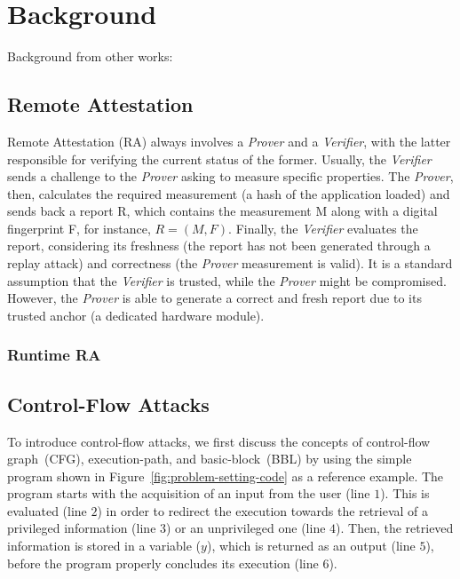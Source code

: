 \chapter{Background}
\label{chp:background} 

Background from other works:

\section{Remote Attestation}
\label{sec:remote-attestation}

Remote Attestation (RA) always involves a \emph{Prover} and a \emph{Verifier}, 
with the latter responsible for verifying the current status of the former. 
Usually, the \emph{Verifier} sends a challenge to the \emph{Prover} asking to 
measure specific properties. The \emph{Prover}, then, calculates the required 
measurement (\eg a hash of the application loaded) and sends back a report R, 
which contains the measurement M along with a digital fingerprint F, for 
instance, $R = (M,F)$. Finally, the \emph{Verifier} evaluates the report, 
considering its freshness (\ie the report has not been generated through a 
replay attack) and correctness (\ie the \emph{Prover} measurement is valid). It 
is a standard assumption that the \emph{Verifier} is trusted, while the 
\emph{Prover} 
might be compromised. However, the \emph{Prover} is able to generate a correct 
and fresh report due to its trusted anchor (\eg a dedicated hardware module).

\subsection{Runtime RA}


\section{Control-Flow Attacks}
\label{control-flow-attacks}

To introduce control-flow attacks, we first discuss the concepts of 
control-flow graph~(CFG), execution-path, and basic-block~(BBL) by using the 
simple program shown in Figure~\ref{fig:problem-setting-code} as a reference 
example. 
The program starts with the acquisition of an input from the user (line $1$). 
This is evaluated (line $2$) in order to redirect the execution towards the 
retrieval of a privileged information (line $3$) or an unprivileged one (line 
$4$). Then, the retrieved information is stored in a variable ($y$), which is 
returned as an output (line $5$), before the program properly concludes its 
execution (line $6$). 

